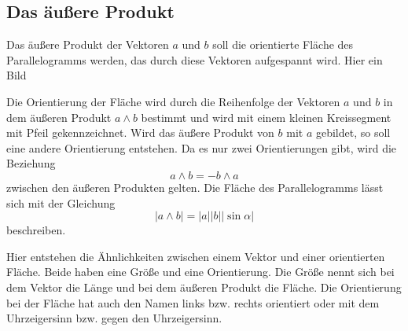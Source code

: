 \documentclass[fleqn]{scrartcl}
\numberwithin{equation}{section}
\begin{document}
\subsection{Das äußere Produkt}
Das äußere Produkt der Vektoren $a$ und $b$ soll die orientierte Fläche des
Parallelogramms werden, das durch diese Vektoren aufgespannt wird. Hier ein
Bild
\begin{center}
\begin{minipage}{\linewidth}
\centering
{}
\label{fig:outherProduct}
\end{minipage}
\end{center}

Die Orientierung der Fläche wird durch die Reihenfolge der Vektoren $a$ und
$b$ in dem äußeren Produkt $a\wedge b$ bestimmt und wird mit einem kleinen
Kreissegment mit Pfeil gekennzeichnet. Wird das äußere Produkt von $b$ mit $a$
gebildet, so soll eine andere Orientierung entstehen. Da es nur zwei
Orientierungen gibt, wird die Beziehung
\[a\wedge b = - b\wedge a\]
zwischen den äußeren Produkten gelten. Die Fläche des Parallelogramms lässt
sich mit der Gleichung
\[|a\wedge b| = |a||b||\sin\alpha|\]
beschreiben.

Hier entstehen die Ähnlichkeiten zwischen einem Vektor und einer orientierten
Fläche. Beide haben eine Größe und eine Orientierung. Die Größe nennt sich bei
dem Vektor die Länge und bei dem äußeren Produkt die Fläche. Die Orientierung
bei der Fläche hat auch den Namen links bzw. rechts orientiert oder mit dem
Uhrzeigersinn bzw. gegen den Uhrzeigersinn.
\end{document}
